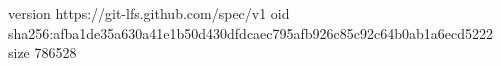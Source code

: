 version https://git-lfs.github.com/spec/v1
oid sha256:afba1de35a630a41e1b50d430dfdcaec795afb926c85c92c64b0ab1a6ecd5222
size 786528
